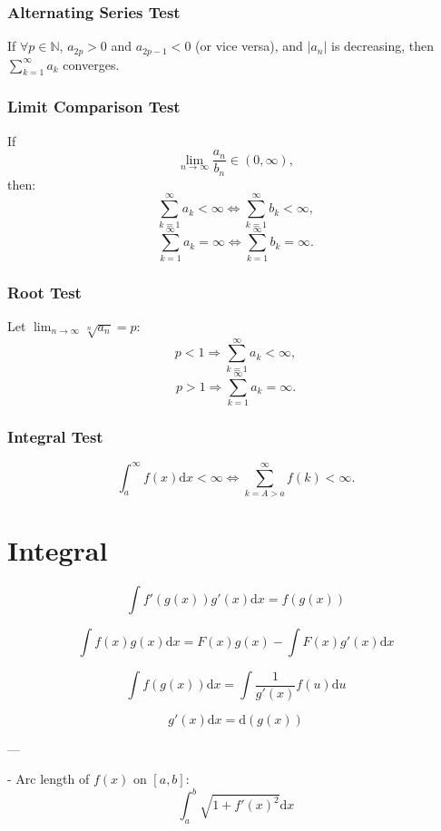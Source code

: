 \documentclass{article}
\begin{document}
\subsubsection{Alternating Series Test}

If $\forall p \in \mathbb{N}$, $a_{2p} > 0$ and $a_{2p-1} < 0$ (or vice versa), and $|a_{n}|$ is decreasing, then $\sum_{k=1}^{\infty} a_{k}$ converges.

\subsubsection{Limit Comparison Test}

If 
\[
\lim_{n\rightarrow\infty} \frac{a_{n}}{b_{n}} \in (0, \infty),
\]
then:
\[
\sum_{k=1}^{\infty} a_{k} < \infty \Longleftrightarrow \sum_{k=1}^{\infty} b_{k} < \infty,
\]
\[
\sum_{k=1}^{\infty} a_{k} = \infty \Longleftrightarrow \sum_{k=1}^{\infty} b_{k} = \infty.
\]

\subsubsection{Root Test}

Let $\lim_{n\rightarrow\infty} \sqrt[n]{a_{n}} = p$:
\[
p < 1 \Longrightarrow \sum_{k=1}^{\infty} a_{k} < \infty,
\]
\[
p > 1 \Longrightarrow \sum_{k=1}^{\infty} a_{k} = \infty.
\]

\subsubsection{Integral Test}

\[
\int_{a}^{\infty} f(x)\mathrm{d}x < \infty \Longleftrightarrow \sum_{k=A>a}^{\infty} f(k) < \infty.
\]

\section{Integral}

\[
\int f'(g(x))g'(x)\mathrm{d}x = f(g(x))
\]

\[
\int f(x)g(x)\mathrm{d}x = F(x)g(x) - \int F(x)g'(x)\mathrm{d}x
\]

\[
\int f(g(x))\mathrm{d}x = \int \frac{1}{g'(x)}f(u)\mathrm{d}u
\]

\[
g'(x)\mathrm{d}x = \mathrm{d}(g(x))
\]

---

- Arc length of \(f(x)\) on \([a,b]\): 
\[
\int_{a}^{b} \sqrt{1 + f'(x)^2} \mathrm{d}x
\]
\end{document}
